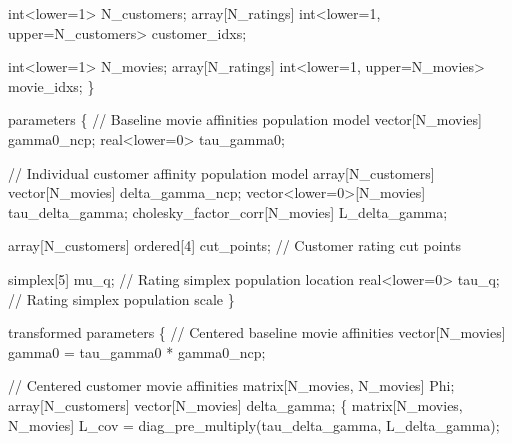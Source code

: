\documentclass[
  letterpaper,
  DIV=11,
  numbers=noendperiod]{scrartcl}
\newenvironment{Shaded}{\begin{snugshade}}{\end{snugshade}}
\newcommand{\CommentTok}[1]{\textcolor[rgb]{0.37,0.37,0.37}{#1}}
\newcommand{\DataTypeTok}[1]{\textcolor[rgb]{0.68,0.00,0.00}{#1}}
\newcommand{\DecValTok}[1]{\textcolor[rgb]{0.68,0.00,0.00}{#1}}
\newcommand{\KeywordTok}[1]{\textcolor[rgb]{0.00,0.23,0.31}{#1}}
\newcommand{\NormalTok}[1]{\textcolor[rgb]{0.00,0.23,0.31}{#1}}
\begin{document}
\begin{codelisting}
\begin{Shaded}
\begin{Highlighting}[]
  \DataTypeTok{int}\NormalTok{\textless{}}\KeywordTok{lower}\NormalTok{=}\DecValTok{1}\NormalTok{\textgreater{} N\_customers;}
  \DataTypeTok{array}\NormalTok{[N\_ratings] }\DataTypeTok{int}\NormalTok{\textless{}}\KeywordTok{lower}\NormalTok{=}\DecValTok{1}\NormalTok{, }\KeywordTok{upper}\NormalTok{=N\_customers\textgreater{} customer\_idxs;}

  \DataTypeTok{int}\NormalTok{\textless{}}\KeywordTok{lower}\NormalTok{=}\DecValTok{1}\NormalTok{\textgreater{} N\_movies;}
  \DataTypeTok{array}\NormalTok{[N\_ratings] }\DataTypeTok{int}\NormalTok{\textless{}}\KeywordTok{lower}\NormalTok{=}\DecValTok{1}\NormalTok{, }\KeywordTok{upper}\NormalTok{=N\_movies\textgreater{} movie\_idxs;}
\NormalTok{\}}

\KeywordTok{parameters}\NormalTok{ \{}
  \CommentTok{// Baseline movie affinities population model}
  \DataTypeTok{vector}\NormalTok{[N\_movies] gamma0\_ncp;}
  \DataTypeTok{real}\NormalTok{\textless{}}\KeywordTok{lower}\NormalTok{=}\DecValTok{0}\NormalTok{\textgreater{} tau\_gamma0;}

  \CommentTok{// Individual customer affinity population model}
  \DataTypeTok{array}\NormalTok{[N\_customers] }\DataTypeTok{vector}\NormalTok{[N\_movies] delta\_gamma\_ncp;}
  \DataTypeTok{vector}\NormalTok{\textless{}}\KeywordTok{lower}\NormalTok{=}\DecValTok{0}\NormalTok{\textgreater{}[N\_movies] tau\_delta\_gamma;}
  \DataTypeTok{cholesky\_factor\_corr}\NormalTok{[N\_movies] L\_delta\_gamma;}

  \DataTypeTok{array}\NormalTok{[N\_customers] }\DataTypeTok{ordered}\NormalTok{[}\DecValTok{4}\NormalTok{] cut\_points; }\CommentTok{// Customer rating cut points}

  \DataTypeTok{simplex}\NormalTok{[}\DecValTok{5}\NormalTok{] mu\_q;     }\CommentTok{// Rating simplex population location}
  \DataTypeTok{real}\NormalTok{\textless{}}\KeywordTok{lower}\NormalTok{=}\DecValTok{0}\NormalTok{\textgreater{} tau\_q; }\CommentTok{// Rating simplex population scale}
\NormalTok{\}}

\KeywordTok{transformed parameters}\NormalTok{ \{}
  \CommentTok{// Centered baseline movie affinities}
  \DataTypeTok{vector}\NormalTok{[N\_movies] gamma0 = tau\_gamma0 * gamma0\_ncp;}

  \CommentTok{// Centered customer movie affinities}
  \DataTypeTok{matrix}\NormalTok{[N\_movies, N\_movies] Phi;}
  \DataTypeTok{array}\NormalTok{[N\_customers] }\DataTypeTok{vector}\NormalTok{[N\_movies] delta\_gamma;}
\NormalTok{  \{}
    \DataTypeTok{matrix}\NormalTok{[N\_movies, N\_movies] L\_cov}
\NormalTok{      = diag\_pre\_multiply(tau\_delta\_gamma, L\_delta\_gamma);}


\end{Highlighting}
\end{Shaded}
\end{codelisting}
\end{document}
